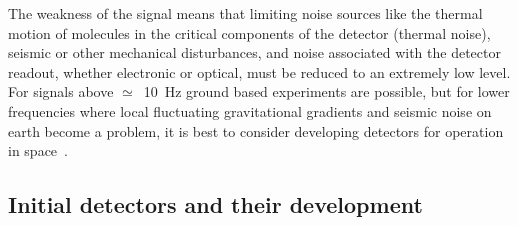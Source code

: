 \documentclass{article}
\begin{document}
The weakness of the signal means that limiting noise sources like the thermal
motion of molecules in the critical components of the detector (thermal noise),
seismic or other mechanical disturbances, and noise associated with the detector
readout, whether electronic or optical, must be reduced to an extremely low
level. For signals above $\simeq$~10~Hz ground based experiments are possible,
but for lower frequencies where local fluctuating gravitational gradients and
seismic noise on earth become a problem, it is best to consider developing
detectors for operation in space~\cite{LISA}.


\subsection{Initial detectors and their development}
\label{subsection:initdet}
\end{document}
